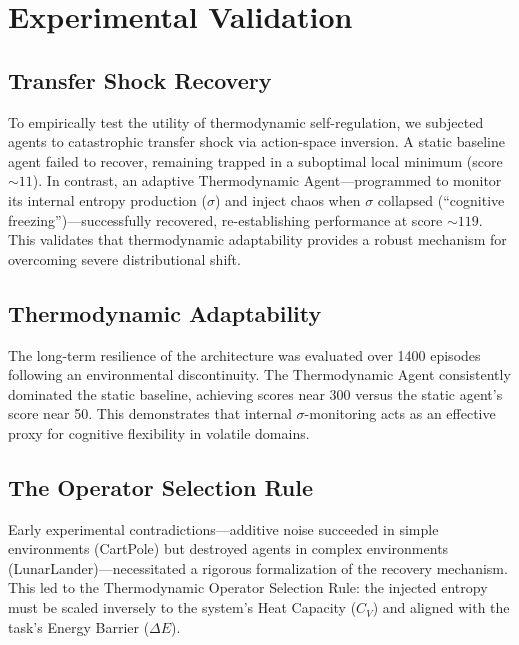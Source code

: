 \documentclass[12pt]{article}
\begin{document}
\section{Experimental Validation}

\subsection{Transfer Shock Recovery}
To empirically test the utility of thermodynamic self-regulation, we subjected agents to catastrophic transfer shock via action-space inversion. A static baseline agent failed to recover, remaining trapped in a suboptimal local minimum (score $\sim 11$). In contrast, an adaptive Thermodynamic Agent---programmed to monitor its internal entropy production ($\sigma$) and inject chaos when $\sigma$ collapsed (``cognitive freezing'')---successfully recovered, re-establishing performance at score $\sim 119$. This validates that thermodynamic adaptability provides a robust mechanism for overcoming severe distributional shift.

\subsection{Thermodynamic Adaptability}
The long-term resilience of the architecture was evaluated over 1400 episodes following an environmental discontinuity. The Thermodynamic Agent consistently dominated the static baseline, achieving scores near 300 versus the static agent's score near 50. This demonstrates that internal $\sigma$-monitoring acts as an effective proxy for cognitive flexibility in volatile domains.

\subsection{The Operator Selection Rule}
Early experimental contradictions---additive noise succeeded in simple environments (CartPole) but destroyed agents in complex environments (LunarLander)---necessitated a rigorous formalization of the recovery mechanism. This led to the Thermodynamic Operator Selection Rule: the injected entropy must be scaled inversely to the system's Heat Capacity ($C_V$) and aligned with the task's Energy Barrier ($\Delta E$).

\begin{table}[h]
\centering
{}
\caption{Validation of the Operator Selection Rule based on system $C_V$ and task $\Delta E$.}
\end{table}
\end{document}
